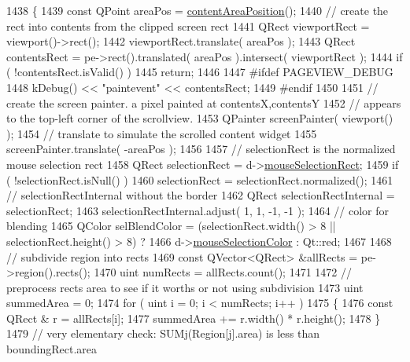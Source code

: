 \begin{DoxyCode}
1438 \{
1439         \textcolor{keyword}{const} QPoint areaPos = \hyperlink{classPageView_a055aaf87367b9ad0dcfcdc3d2f5ff619}{contentAreaPosition}();
1440         \textcolor{comment}{// create the rect into contents from the clipped screen rect}
1441         QRect viewportRect = viewport()->rect();
1442         viewportRect.translate( areaPos );
1443         QRect contentsRect = pe->rect().translated( areaPos ).intersect( viewportRect );
1444         \textcolor{keywordflow}{if} ( !contentsRect.isValid() )
1445             \textcolor{keywordflow}{return};
1446 
1447 \textcolor{preprocessor}{#ifdef PAGEVIEW\_DEBUG}
1448         kDebug() << \textcolor{stringliteral}{"paintevent"} << contentsRect;
1449 \textcolor{preprocessor}{#endif}
1450 
1451         \textcolor{comment}{// create the screen painter. a pixel painted at contentsX,contentsY}
1452         \textcolor{comment}{// appears to the top-left corner of the scrollview.}
1453         QPainter screenPainter( viewport() );
1454         \textcolor{comment}{// translate to simulate the scrolled content widget}
1455         screenPainter.translate( -areaPos );
1456 
1457         \textcolor{comment}{// selectionRect is the normalized mouse selection rect}
1458         QRect selectionRect = d->\hyperlink{classPageViewPrivate_a94473cb593838a977bea89214bd1ef66}{mouseSelectionRect};
1459         \textcolor{keywordflow}{if} ( !selectionRect.isNull() )
1460             selectionRect = selectionRect.normalized();
1461         \textcolor{comment}{// selectionRectInternal without the border}
1462         QRect selectionRectInternal = selectionRect;
1463         selectionRectInternal.adjust( 1, 1, -1, -1 );
1464         \textcolor{comment}{// color for blending}
1465         QColor selBlendColor = (selectionRect.width() > 8 || selectionRect.height() > 8) ?
1466                             d->\hyperlink{classPageViewPrivate_ab09ba74cc55e9a99a5e7c0629dde8feb}{mouseSelectionColor} : Qt::red;
1467 
1468         \textcolor{comment}{// subdivide region into rects}
1469         \textcolor{keyword}{const} QVector<QRect> &allRects = pe->region().rects();
1470         uint numRects = allRects.count();
1471 
1472         \textcolor{comment}{// preprocess rects area to see if it worths or not using subdivision}
1473         uint summedArea = 0;
1474         \textcolor{keywordflow}{for} ( uint i = 0; i < numRects; i++ )
1475         \{
1476             \textcolor{keyword}{const} QRect & r = allRects[i];
1477             summedArea += r.width() * r.height();
1478         \}
1479         \textcolor{comment}{// very elementary check: SUMj(Region[j].area) is less than boundingRect.area}

\end{DoxyCode}
